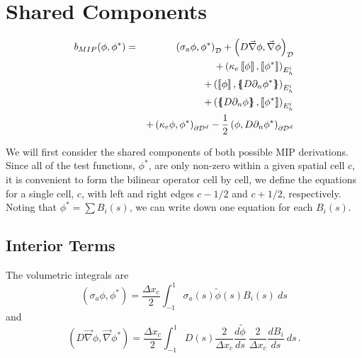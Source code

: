 \documentclass[11pt]{article}
\newcommand{\benum}{\begin{equation}}
\newcommand{\eenum}{\end{equation}}
\newcommand{\bea}{\begin{eqnarray*}}
\newcommand{\eea}{\end{eqnarray*}}
\newcommand{\del}{\ensuremath{ \vec{\nabla} }}
\newcommand{\B}[1]{\ensuremath{{B_{#1} }}}
\newcommand{\p}{\ensuremath{ d}}
\newcommand{\jmp}[1]{\ensuremath{\left\llbracket #1 \right\rrbracket}}
\newcommand{\avg}[1]{\ensuremath{ \left \{ \hspace{-0.055in} \left \{ #1  \right \}\hspace{-0.055in} \right \} }}
\newcommand{\pep}{\, .}
\begin{document}
\section{Shared Components}

\bea
b_{MIP}(\phi,\phi^*) = &&\left( \sigma_a\phi,\phi^* \right)_{\cal D} + \left( D\del\phi,\del\phi \right)_{\cal D} \\
&& +\left( \kappa_e \jmp{\phi},\jmp{\phi^*}\right)_{E_h^i} \\
&& +\left(  \jmp{\phi}, \avg{ D\partial_n \phi^*}\right)_{E_h^i} \\
&& +\left( \avg{D\partial_n\phi}, \jmp{\phi^*} \right)_{E_h^i} \\
&& +\left( \kappa_e \phi, \phi^*\right)_{\partial {\cal D}^d} - \frac{1}{2}\left( \phi, D\partial_n \phi^* \right)_{\partial {\cal D}^d} 
\eea

We will first consider the shared components of both possible MIP derivations.
Since all of the test functions, $\phi^*$, are only non-zero within a given spatial cell $c$, it is convenient to form the bilinear operator cell by cell, we define the equations for a single cell, $c$, with left and right edges $c-1/2$ and $c+1/2$, respectively.
Noting that $\phi^* = \sum{B_i(s)}$, we can write down one equation for each $B_i(s)$.

\subsection{Interior Terms}

The volumetric integrals are
\benum
\left( \sigma_a\phi,\phi^* \right) = \frac{\Delta x_c}{2} \int_{-1}^1{\sigma_a(s)\widetilde{\phi}(s) \B{i}(s)~ds}
\label{eq:vol1}
\eenum
and
\benum
\left( D \del \phi, \del \phi^* \right) = \frac{\Delta x_c}{2} \int_{-1}^1{ D(s) \frac{2}{\Delta x_c} \frac{ \p \widetilde{\phi}}{\p s}~ \frac{2}{\Delta x_c} \frac{\p \B{i}}{\p s}~ds} \pep
\label{eq:vol2}
\eenum
\end{document}

